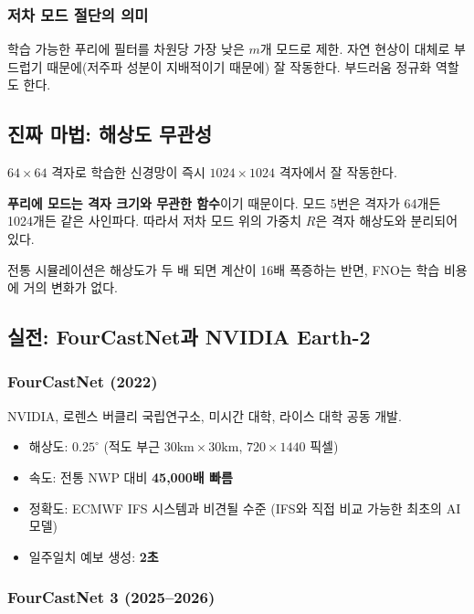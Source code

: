 \documentclass[11pt,a4paper]{article}
\begin{document}
\subsubsection{저차 모드 절단의 의미}

학습 가능한 푸리에 필터를 차원당 가장 낮은 $m$개 모드로 제한. 자연 현상이 대체로 부드럽기 때문에(저주파 성분이 지배적이기 때문에) 잘 작동한다. 부드러움 정규화 역할도 한다.

\subsection{진짜 마법: 해상도 무관성}

\begin{insightbox}
$64 \times 64$ 격자로 학습한 신경망이 즉시 $1024 \times 1024$ 격자에서 잘 작동한다.

\textbf{푸리에 모드는 격자 크기와 무관한 함수}이기 때문이다. 모드 5번은 격자가 64개든 1024개든 같은 사인파다. 따라서 저차 모드 위의 가중치 $R$은 격자 해상도와 분리되어 있다.

전통 시뮬레이션은 해상도가 두 배 되면 계산이 16배 폭증하는 반면, FNO는 학습 비용에 거의 변화가 없다.
\end{insightbox}

\subsection{실전: FourCastNet과 NVIDIA Earth-2}

\subsubsection{FourCastNet (2022)}

NVIDIA, 로렌스 버클리 국립연구소, 미시간 대학, 라이스 대학 공동 개발.

\begin{itemize}
\item 해상도: $0.25^\circ$ (적도 부근 $30\text{km} \times 30\text{km}$, $720 \times 1440$ 픽셀)
\item 속도: 전통 NWP 대비 \textbf{45,000배 빠름}
\item 정확도: ECMWF IFS 시스템과 비견될 수준 (IFS와 직접 비교 가능한 최초의 AI 모델)
\item 일주일치 예보 생성: \textbf{2초}
\end{itemize}

\subsubsection{FourCastNet 3 (2025--2026)}
\end{document}

